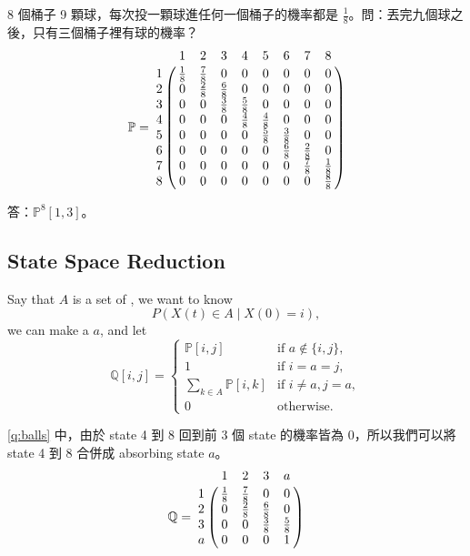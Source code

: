 \begin{question} \label{q:balls}
8 個桶子 9 顆球，每次投一顆球進任何一個桶子的機率都是 $ \frac{1}{8} $。問：丟完九個球之後，只有三個桶子裡有球的機率？
\[ \mathbb{P} = \bordermatrix{
    & 1 & 2 & 3 & 4 & 5 & 6 & 7 & 8 \cr
  1 & \frac{1}{8} & \frac{7}{8} & 0 & 0 & 0 & 0 & 0 & 0 \cr
  2 & 0 & \frac{2}{8} & \frac{6}{8} & 0 & 0 & 0 & 0 & 0 \cr
  3 & 0 & 0 & \frac{3}{8} & \frac{5}{8} & 0 & 0 & 0 & 0 \cr
  4 & 0 & 0 & 0 & \frac{4}{8} & \frac{4}{8} & 0 & 0 & 0 \cr
  5 & 0 & 0 & 0 & 0 & \frac{5}{8} & \frac{3}{8} & 0 & 0 \cr
  6 & 0 & 0 & 0 & 0 & 0 & \frac{6}{8} & \frac{2}{8} & 0 \cr
  7 & 0 & 0 & 0 & 0 & 0 & 0 & \frac{7}{8} & \frac{1}{8} \cr
  8 & 0 & 0 & 0 & 0 & 0 & 0 & 0 & \frac{8}{8}
} \]
\begin{figure}[htp]
\centering
{}
\end{figure}

答：$ \mathbb{P}^{8} [1, 3] $。
\end{question}

\subsection{State Space Reduction}

Say that $ A $ is a set of , we want to know
\[ P(X(t) \in A \mid X(0) = i), \]
we can make a  $ a $, and let
\[ \mathbb{Q}[i, j] = \begin{cases}
  \mathbb{P}[i, j]                & \text{if } a \not\in \{i, j\}, \\
  1                               & \text{if } i = a = j, \\
  \sum_{k \in A} \mathbb{P}[i, k] & \text{if } i \neq a, j = a, \\
  0                               & \text{otherwise.}
\end{cases} \]

\begin{example}
\autoref{q:balls} 中，由於 state 4 到 8 回到前 3 個 state 的機率皆為 0，所以我們可以將 state 4 到 8 合併成 absorbing state $ a $。
\[ \mathbb{Q} = \bordermatrix{
    & 1 & 2 & 3 & a \cr
  1 & \frac{1}{8} & \frac{7}{8} & 0 & 0 \cr
  2 & 0 & \frac{2}{8} & \frac{6}{8} & 0 \cr
  3 & 0 & 0 & \frac{3}{8} & \frac{5}{8} \cr
  a & 0 & 0 & 0 & 1 \cr
} \]
\end{example}
